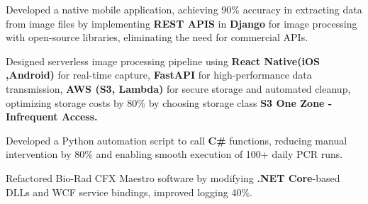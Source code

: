 \documentclass[a4paper,20pt]{article}
\newcommand{\resumeItemexp}[1]{
  \item\small{
    {#1 \vspace{-2pt}}
  }
}
\begin{document}
    	
	\resumeItemexp{Developed a native mobile application, achieving 90\% accuracy in extracting data from image files by implementing \textbf{REST APIS} in \textbf{Django} for image processing with open-source libraries, eliminating the need for commercial APIs.}
	\resumeItemexp{Designed serverless image processing pipeline using \textbf{React Native(iOS ,Android)}  for real-time capture, \textbf{FastAPI} for high-performance data transmission, \textbf{AWS (S3, Lambda)} for secure storage and automated cleanup, optimizing storage costs by 80\% by choosing storage class \textbf{S3 One Zone - Infrequent Access.}}
	
	    \resumeItemexp{Developed a Python automation script to call \textbf{ C\#} functions, reducing manual intervention by 80\% and enabling smooth execution of 100+ daily PCR runs.}
    \resumeItemexp{Refactored Bio-Rad CFX Maestro software by modifying \textbf{.NET Core}-based DLLs and WCF service bindings, improved logging  40\%.}
    
	
       
        
        
\end{document}
